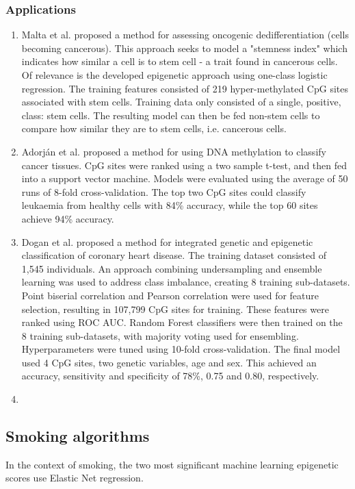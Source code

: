 \documentclass{article}
\begin{document}
\subsubsection{Applications} \label{sec:ml-examples}
\begin{enumerate}
    \item Malta et al. \cite{malta2018machine} proposed a method for assessing oncogenic dedifferentiation (cells becoming cancerous). This approach seeks to model a "stemness index" which indicates how similar a cell is to stem cell - a trait found in cancerous cells. Of relevance is the developed epigenetic approach using one-class logistic regression. The training features consisted of 219 hyper-methylated CpG sites associated with stem cells. Training data only consisted of a single, positive, class: stem cells. The resulting model can then be fed non-stem cells to compare how similar they are to stem cells, i.e. cancerous cells.

    \item Adorj\'an et al. \cite{adorjan2002tumour} proposed a method for using DNA methylation to classify cancer tissues. CpG sites were ranked using a two sample t-test, and then fed into a support vector machine. Models were evaluated using the average of 50 runs of 8-fold cross-validation. The top two CpG sites could classify leukaemia from healthy cells with 84\% accuracy, while the top 60 sites achieve 94\% accuracy.

    \item Dogan et al. \cite{dogan2018integrated} proposed a method for integrated genetic and epigenetic classification of coronary heart disease. The training dataset consisted of 1,545 individuals. An approach combining undersampling and ensemble learning \cite{liu2008exploratory} was used to address class imbalance, creating 8 training sub-datasets. Point biserial correlation and Pearson correlation were used for feature selection, resulting in 107,799 CpG sites for training. These features were ranked using ROC AUC. Random Forest classifiers were then trained on the 8 training sub-datasets, with majority voting used for ensembling. Hyperparameters were tuned using 10-fold cross-validation. The final model used 4 CpG sites, two genetic variables, age and sex. This achieved an accuracy, sensitivity and specificity of 78\%, 0.75 and 0.80, respectively.

    \item
\end{enumerate}

\subsection{Smoking algorithms}
In the context of smoking, the two most significant machine learning epigenetic scores use Elastic Net regression.
\end{document}
